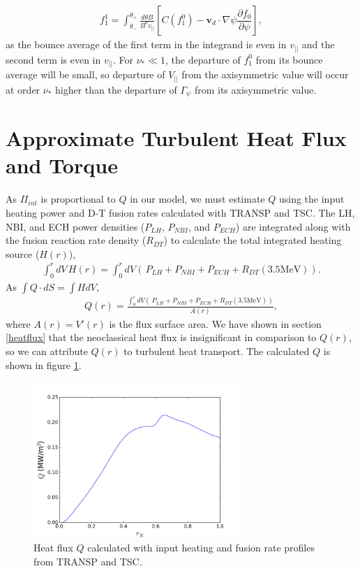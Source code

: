 \documentclass{article}
\numberwithin{figure}{section}
\numberwithin{equation}{section}
\newcommand{\partder}[2]{\dfrac{\partial  #1}{\partial  #2}} %
\begin{document}
\begin{gather}
f_{1}^1 = \int_{\theta_-}^{\theta_+} \frac{d \theta B}{B^{\theta} v_{||}} \left[C(f_1^0) - \bm{v}_d \cdot \nabla \psi \partder{f_0}{\psi} \right],
\end{gather}
as the bounce average of the first term in the integrand is even in $v_{||}$ and the second term is even in $v_{||}$.
For $\nu_* \ll 1$, the departure of $f_1^0$ from its bounce average will be small, so departure of $V_{||}$ from the axisymmetric value will occur at order $\nu_*$ higher than the departure of $\Gamma_{\psi}$ from its axisymmetric value.

\section{Approximate Turbulent Heat Flux and Torque}\label{turbQ}

As $\Pi_{int}$ is proportional to $Q$ in our model, we must estimate $Q$ using the input heating power and D-T fusion rates calculated with TRANSP and TSC. The LH, NBI, and ECH power densities ($P_{LH}$, $P_{NBI}$, and $P_{ECH}$) are integrated along with the fusion reaction rate density ($R_{DT}$) to calculate the total integrated heating source ($H(r)$),
\begin{gather}
\int_0^r dV \, H(r) = \int_0^r dV \left(\, P_{LH} + P_{NBI} + P_{ECH} + R_{DT} (3.5 \text{MeV}) \right).
\end{gather}
As $\int Q \cdot dS = \int H dV$, 
\begin{gather}
Q(r) = \frac{\int_0^r dV \left(\, P_{LH} + P_{NBI} + P_{ECH} + R_{DT} (3.5 \text{MeV}) \right)}{A(r)},
\end{gather}
where $A(r) = V'(r)$ is the flux surface area. We have shown in section \ref{heatflux} that the neoclassical heat flux is insignificant in comparison to $Q(r)$, so we can attribute $Q(r)$ to turbulent heat transport. The calculated $Q$ is shown in figure \ref{fig:turbHeatFlux}.

\begin{figure}[h!]
\centering
\includegraphics[width=0.7\textwidth]{turbHeatFlux.png}
\caption{\label{fig:turbHeatFlux} Heat flux $Q$ calculated with input heating and fusion rate profiles from TRANSP and TSC.}
\end{figure}
\end{document}
